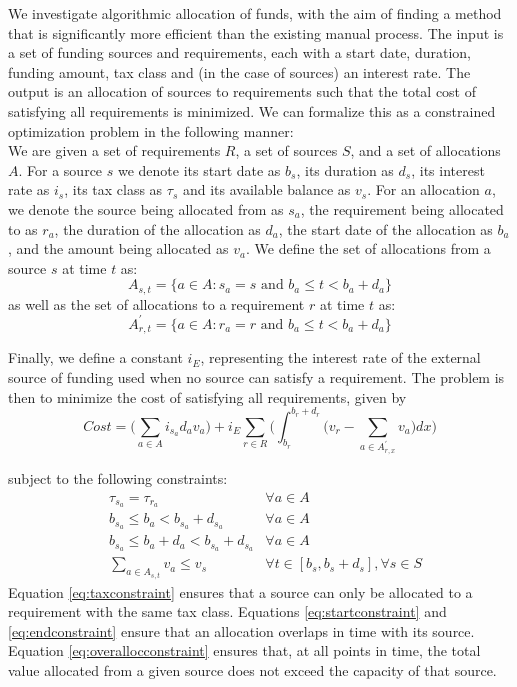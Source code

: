 \documentclass{sig-alternate}
\begin{document}
We investigate algorithmic allocation of funds, with the aim of finding a method that is significantly more efficient than the existing manual process. The input is a set of funding sources and requirements, each with a start date, duration, funding amount, tax class and (in the case of sources) an interest rate. The output is an allocation of sources to requirements such that the total cost of satisfying all requirements is minimized.
We can formalize this as a constrained optimization problem in the following manner: \\
We are given a set of requirements $R$, a set of sources $S$, and a set of allocations $A$. For a source $s$ we denote its start date as $b_s$, its duration as $d_s$, its interest rate as $i_s$, its tax class as $\tau_s$ and its available balance as $v_s$. For an allocation $a$, we denote the source being allocated from as $s_a$, the requirement being allocated to as $r_a$, the duration of the allocation as $d_a$, the start date of the allocation as $b_a$, and the amount being allocated as $v_a$. We define the set of allocations from a source $s$ at time $t$ as:
\[ A_{s,t} = \{a \in A : s_a = s \text{ and } b_a \leq t < b_a + d_a \} \]
as well as the set of allocations to a requirement $r$ at time $t$ as:
\[ A^\prime_{r,t} = \{a \in A : r_a = r \text{ and } b_a \leq t < b_a + d_a \} \]

Finally, we define a constant $i_E$, representing the interest rate of the external source of funding used when no source can satisfy a requirement. The problem is then to minimize the cost of satisfying all requirements, given by
$$
Cost = \bigg( \sum_{a \in A} i_{s_a} d_a v_a \bigg) +  i_E \sum_{r \in R}\bigg(\int_{b_r}^{b_r + d_r} \bigg( v_r - \sum_{a \in A^\prime_{r, x}}v_a \bigg) dx \bigg)
$$

subject to the following constraints:
\begin{align}
&\tau_{s_a} = \tau_{r_a} &\forall a \in A \label{eq:taxconstraint}\\
&b_{s_a} \leq b_a < b_{s_a} + d_{s_a} &\forall a \in A \label{eq:startconstraint}\\
&b_{s_a} \leq b_a + d_a < b_{s_a} + d_{s_a} &\forall a \in A \label{eq:endconstraint}\\
&\sum_{a \in A_{s,t}} v_a \leq v_s &\forall t \in [b_s, b_s + d_s], \forall s \in S \label{eq:overallocconstraint}
\end{align}
Equation \ref{eq:taxconstraint} ensures that a source can only be allocated to a requirement with the same tax class. Equations \ref{eq:startconstraint} and \ref{eq:endconstraint} ensure that an allocation overlaps in time with its source. Equation \ref{eq:overallocconstraint} ensures that, at all points in time, the total value allocated from a given source does not exceed the capacity of that source.
\end{document}
